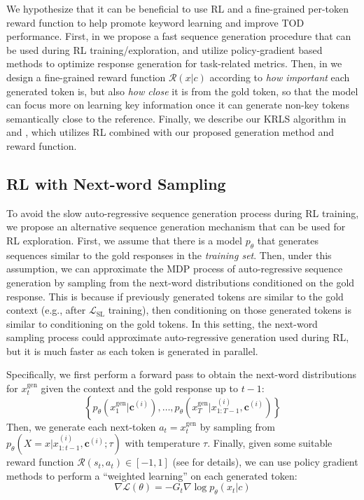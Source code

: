 We hypothesize that it can be beneficial to use RL and a fine-grained per-token reward function to help promote keyword learning and improve TOD performance. 
First, in  we propose a fast sequence generation procedure that can be used during RL training/exploration, and utilize policy-gradient based methods \cite{policy-gradient,REINFORCE, PPO} to optimize response generation for task-related metrics. Then, in  we design a fine-grained reward function $\mathcal{R}(x|c)$ according to \emph{how important} each generated token is, but also \emph{how close} it is from the gold token, so that the model can focus more on learning key information once it can generate non-key tokens semantically close to the reference. Finally, we describe our KRLS algorithm in  and , which utilizes RL combined with our proposed generation method and reward function.

\subsection{RL with Next-word Sampling}
\label{sec:RL with Next-word Sampling}
To avoid the slow auto-regressive sequence generation process during RL training, we propose an alternative sequence generation mechanism that can be used for RL exploration.
First, we assume that there is a model $p_\theta$ that generates sequences similar to the gold responses in the \emph{training set}. 
Then, under this assumption, we can approximate the MDP process of auto-regressive sequence generation by sampling from the next-word distributions conditioned on the gold response.
This is because if previously generated tokens are similar to the gold context (e.g., after $\mathcal{L}_{\mathrm{SL}}$ training), then conditioning on those generated tokens is similar to conditioning on the gold tokens.
In this setting, the next-word sampling process could approximate auto-regressive generation used during RL, but it is much faster as each token is generated in parallel.

Specifically, we first perform a forward pass to obtain the next-word distributions for $x_{t}^{\mathrm{gen}}$ given the context and the gold response up to $t-1$:
\begin{equation}\label{eq:next-word-dist}
  \left\{ p_\theta(x^{\mathrm{gen}}_{1}|\mathbf{c}^{(i)}), \dots, p_\theta(x^{\mathrm{gen}}_{T}|x^{(i)}_{1:T-1},\mathbf{c}^{(i)}) \right\}
\end{equation}
Then, we generate each next-token $a_{t}=x^{\mathrm{gen}}_t$ by sampling from $p_\theta(X=x|x^{(i)}_{1:t-1},\mathbf{c}^{(i)};\tau)$ with temperature $\tau$. Finally, given some suitable reward function $\mathcal{R}(s_t, a_t)\in [-1,1]$ (see  for details), we can use policy gradient methods \cite{policy-gradient, REINFORCE} to perform a ``weighted learning'' on each generated token: 
\begin{equation}\label{eq:real_policy_gradient}
  \nabla \mathcal{L}(\theta) = -G_t \nabla \log p_\theta(x_t|c)
\end{equation}

